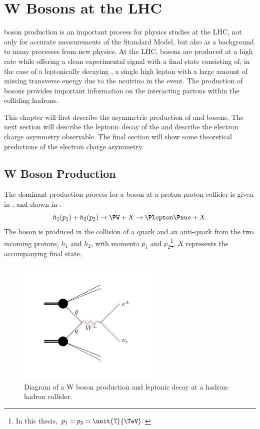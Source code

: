 \chapter{W Bosons at the LHC}
\label{chap:wboson}

\PW boson production is an important process for physics studies at the LHC, not
only for accurate measurements of the Standard Model, but also as a background
to many processes from new physics. 
At the {LHC}, \PW bosons are produced at a high rate while offering a clean
experimental signal with a final state consisting of, in the case of a
leptonically decaying \PW, a single high \PT lepton with a large amount of
missing transverse energy due to the neutrino in the event. 
The production of \PW bosons provides important
information on the interacting partons within the colliding
hadrons\cite{catani,kom}.

This chapter will first describe the asymmetric production of \PWp and \PWm bosons.
The next section will describe the leptonic decay of the \PW and describe the electron
charge asymmetry observable. The final section will show some theoretical
predictions of the electron charge asymmetry.

\section{W Boson Production}

The dominant production process for a \PW boson at a proton-proton collider is
given in ,
and shown in . 
\begin{equation}
  h_1(p_1) + h_2(p_2)
  \to 
  \PW + X
  \to
  \Plepton \Pnue + X.
  \label{wbos:wprod}
\end{equation}
The \PW boson is produced in the collision of a quark and an anti-quark from the
two incoming protons, $h_1$ and $h_2$, with momenta $p_1$ and $p_2$\footnote{In
this thesis, $p_1 = p_2 = \unit{7}{\TeV}. $}.  $X$ represents the accompanying
final state.

\begin{figure}[htbp]
  \centering
  \includegraphics[width=0.6\textwidth]{w_production}
  \caption{Diagram of a W boson production and leptonic decay at a hadron-hadron collider.}
  \label{wbos:wproddiag}
\end{figure}

